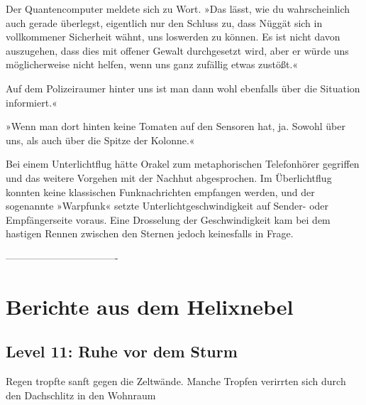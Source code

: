 Der Quantencomputer meldete sich zu Wort. »Das lässt, wie du wahrscheinlich auch gerade überlegst, eigentlich nur den Schluss zu, dass Nüggät sich in vollkommener Sicherheit wähnt, uns loswerden zu können. Es ist nicht davon auszugehen, dass dies mit offener Gewalt durchgesetzt wird, aber er würde uns möglicherweise nicht helfen, wenn uns ganz zufällig etwas zustößt.«

 Auf dem Polizeiraumer hinter uns ist man dann wohl ebenfalls über die Situation informiert.«

»Wenn man dort hinten keine Tomaten auf den Sensoren hat, ja. Sowohl über uns, als auch über die Spitze der Kolonne.«

Bei einem Unterlichtflug hätte Orakel zum metaphorischen Telefonhörer gegriffen und das weitere Vorgehen mit der Nachhut abgesprochen. Im Überlichtflug konnten keine klassischen Funknachrichten empfangen werden, und der sogenannte »Warpfunk« setzte Unterlichtgeschwindigkeit auf Sender- oder Empfängerseite voraus. Eine Drosselung der Geschwindigkeit kam bei dem hastigen Rennen zwischen den Sternen jedoch keinesfalls in Frage.












%









----------------------------------


\chapter{Berichte aus dem Helixnebel}

\section{Level 11: Ruhe vor dem Sturm}

Regen tropfte sanft gegen die Zeltwände. Manche Tropfen verirrten sich durch den Dachschlitz in den Wohnraum














